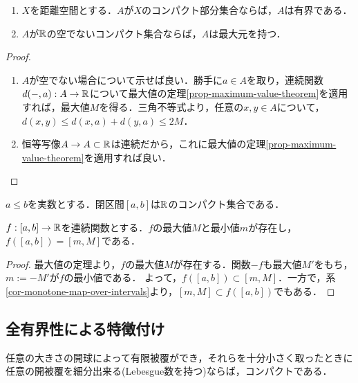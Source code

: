 \documentclass[uplatex,dvipdfmx]{jsreport}
\begin{document}
\begin{corollary}[距離空間のコンパクト集合]\label{cor-compact-sets-in-metric-space-is-bounded}\mbox{}
    \begin{enumerate}
        \item $X$を距離空間とする．$A$が$X$のコンパクト部分集合ならば，$A$は有界である．
        \item $A$が$\mathbb{R}$の空でないコンパクト集合ならば，$A$は最大元を持つ．
    \end{enumerate}
\end{corollary}
\begin{proof}\mbox{}
    \begin{enumerate}
        \item $A$が空でない場合について示せば良い．勝手に$a\in A$を取り，連続関数$d(-,a):A\to\mathbb{R}$について最大値の定理\ref{prop-maximum-value-theorem}を適用すれば，最大値$M$を得る．三角不等式より，任意の$x,y\in A$について，$d(x,y)\le d(x,a)+d(y,a)\le 2M$．
        \item 恒等写像$A\to A\subset\mathbb{R}$は連続だから，これに最大値の定理\ref{prop-maximum-value-theorem}を適用すれば良い．
    \end{enumerate}
\end{proof}
\begin{theorem}\label{thm-Heine-Borel}
    $a\le b$を実数とする．閉区間$[a,b]$は$\mathbb{R}$のコンパクト集合である．
\end{theorem}

\begin{corollary}
    $f:[a,b]\to\mathbb{R}$を連続関数とする．$f$の最大値$M$と最小値$m$が存在し，$f([a,b])=[m,M]$である．
\end{corollary}
\begin{proof}
    最大値の定理より，$f$の最大値$M$が存在する．関数$-f$も最大値$M'$をもち，$m:=-M'$が$f$の最小値である．
    よって，$f([a,b])\subset[m,M]$．一方で，系\ref{cor-monotone-map-over-intervals}より，$[m,M]\subset f([a,b])$でもある．
\end{proof}

\subsection{全有界性による特徴付け}

\begin{tcolorbox}[colframe=ForestGreen, colback=ForestGreen!10!white,breakable,colbacktitle=ForestGreen!40!white,coltitle=black,fonttitle=\bfseries\sffamily,
title=]
    任意の大きさの開球によって有限被覆ができ，それらを十分小さく取ったときに任意の開被覆を細分出来る(Lebesgue数を持つ)ならば，コンパクトである．
\end{tcolorbox}
\end{document}
